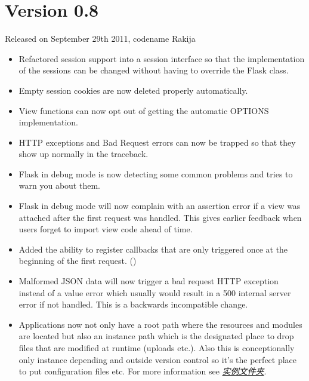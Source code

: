 \documentclass[a4paper,12pt]{sphinxmanual}
\begin{document}
\section{Version 0.8}
\label{changelog:version-0-8}
Released on September 29th 2011, codename Rakija
\begin{itemize}
\item {} 
Refactored session support into a session interface so that
the implementation of the sessions can be changed without
having to override the Flask class.

\item {} 
Empty session cookies are now deleted properly automatically.

\item {} 
View functions can now opt out of getting the automatic
OPTIONS implementation.

\item {} 
HTTP exceptions and Bad Request errors can now be trapped so that they
show up normally in the traceback.

\item {} 
Flask in debug mode is now detecting some common problems and tries to
warn you about them.

\item {} 
Flask in debug mode will now complain with an assertion error if a view
was attached after the first request was handled.  This gives earlier
feedback when users forget to import view code ahead of time.

\item {} 
Added the ability to register callbacks that are only triggered once at
the beginning of the first request. ()

\item {} 
Malformed JSON data will now trigger a bad request HTTP exception instead
of a value error which usually would result in a 500 internal server
error if not handled.  This is a backwards incompatible change.

\item {} 
Applications now not only have a root path where the resources and modules
are located but also an instance path which is the designated place to
drop files that are modified at runtime (uploads etc.).  Also this is
conceptionally only instance depending and outside version control so it's
the perfect place to put configuration files etc.  For more information
see {\hyperref[config:instance-folders]{\emph{实例文件夹}}}.


\end{itemize}
\end{document}
